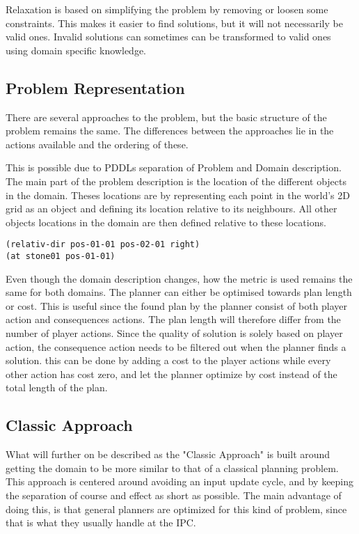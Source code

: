 	Relaxation is based on simplifying the problem by removing or loosen some constraints. This makes it easier to find solutions, but it will not necessarily be valid ones. Invalid solutions can sometimes can be transformed to valid ones using domain specific knowledge.
	
	\subsection{Problem Representation}
		There are several approaches to the problem, but the basic structure of the problem remains the same. The differences between the approaches lie in the actions available and the ordering of these. 


		This is possible due to PDDLs separation of Problem and Domain description. The main part of the problem description is the location of the different objects in the domain. Theses locations are by representing each point in the world's 2D grid as an object and defining its location relative to its neighbours. All other objects locations in the domain are then defined relative to these locations.
		\begin{lstlisting}
(relativ-dir pos-01-01 pos-02-01 right)
(at stone01 pos-01-01)
		\end{lstlisting}
		

		
		Even though the domain description changes, how the metric is used remains the same for both domains. The planner can either be optimised towards plan length or cost. This is useful since the found plan by the planner consist of both player action and consequences actions. The plan length will therefore differ from the number of player actions. Since the quality of solution is solely based on player action, the consequence action needs to be filtered out when the planner finds a solution. this can be done by adding a cost to the player actions while every other action has cost zero, and let the planner optimize by cost instead of the total length of the plan.		

		
		\subsection{Classic Approach}
		What will further on be described as the "Classic Approach" is built around getting the domain to be more similar to that of a classical planning problem. 
		This approach is centered around avoiding an input update cycle, and by keeping the separation of course and effect as short as possible. The main advantage of doing this, is that general planners are optimized for this kind of problem, since that is what they usually handle at the IPC.
		
